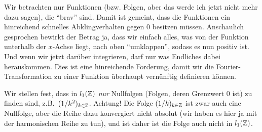 \begin{remark}
Wir betrachten nur Funktionen (bzw. Folgen, aber das werde ich jetzt nicht mehr dazu 
sagen), die \enquote{brav} sind. Damit ist gemeint, dass die Funktionen ein hinreichend schnelles 
Abklingverhalten gegen $ 0 $ besitzen müssen. Anschaulich gesprochen bewirkt der Betrag ja, dass 
wir einfach alles, was von der Funktion unterhalb der $ x $-Achse liegt, nach oben 
\enquote{umklappen}, sodass es nun positiv ist. Und wenn wir jetzt darüber integrieren, darf nur 
was Endliches dabei herauskommen. Dies ist eine hinreichende Forderung, damit wir die 
Fourier-Transformation zu einer Funktion überhaupt vernünftig definieren können.

Wir stellen fest, dass in $ l_{1}(\mathbb{Z}) $ \emph{nur} Nullfolgen (Folgen, deren
Grenzwert $ 0 $ ist) zu finden sind, z.B.\ $ (1 / k^2)_{k \in \mathbb{Z}} $. Achtung! Die Folge 
$ (1 / k)_{k \in \mathbb{Z}} $ ist zwar auch eine Nullfolge, aber die Reihe dazu konvergiert nicht 
absolut (wir haben es hier ja mit der harmonischen Reihe zu tun), und ist daher ist die Folge auch 
nicht in $ l_{1}(\mathbb{Z}) $.
\end{remark}

